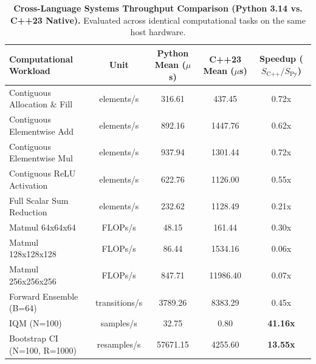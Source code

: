 \begin{table}[t]
\centering
\small
\caption{\textbf{Cross-Language Systems Throughput Comparison (Python 3.14 vs. C++23 Native).} Evaluated across identical computational tasks on the same host hardware.}
\label{tab:cross_language_comparison}
\begin{tabular}{lcccc}
\toprule
\textbf{Computational Workload} & \textbf{Unit} & \textbf{Python Mean} ($\mu$s) & \textbf{C++23 Mean} ($\mu$s) & \textbf{Speedup} ($S_{\text{C++}} / S_{\text{Py}}$) \\
\midrule
Contiguous Allocation \& Fill & elements/s & 316.61 & 437.45 & 0.72x \\
Contiguous Elementwise Add & elements/s & 892.16 & 1447.76 & 0.62x \\
Contiguous Elementwise Mul & elements/s & 937.94 & 1301.44 & 0.72x \\
Contiguous ReLU Activation & elements/s & 622.76 & 1126.00 & 0.55x \\
Full Scalar Sum Reduction & elements/s & 232.62 & 1128.49 & 0.21x \\
Matmul 64x64x64 & FLOPs/s & 48.15 & 161.44 & 0.30x \\
Matmul 128x128x128 & FLOPs/s & 86.44 & 1534.16 & 0.06x \\
Matmul 256x256x256 & FLOPs/s & 847.71 & 11986.40 & 0.07x \\
Forward Ensemble (B=64) & transitions/s & 3789.26 & 8383.29 & 0.45x \\
IQM (N=100) & samples/s & 32.75 & 0.80 & \textbf{41.16x} \\
Bootstrap CI (N=100, R=1000) & resamples/s & 57671.15 & 4255.60 & \textbf{13.55x} \\
\bottomrule
\end{tabular}
\end{table}
